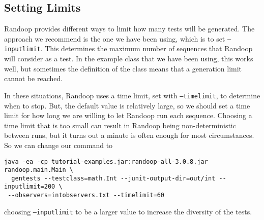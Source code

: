 \documentclass[11pt, oneside]{article} %
\newcommand{\cmd}[1]{{\texttt{#1}}}
\begin{document}
\subsection{Setting Limits}
Randoop provides different ways to limit how many tests will be generated.
The approach we recommend is the one we have been using, which is to set \cmd{--inputlimit}.
This determines the maximum number of sequences that Randoop will consider as a test.
In the example class that we have been using, this works well, but sometimes the definition of the class means that a generation limit cannot be reached.

In these situations, Randoop uses a time limit, set with \cmd{--timelimit}, to determine when to stop.
But, the default value is relatively large, so we should set a time limit for how long we are willing to let Randoop run each sequence. 
Choosing a time limit that is too small can result in Randoop being non-deterministic between runs, but it turns out a minute is often enough for most circumstances.
So we can change our command to 
\begin{verbatim}
java -ea -cp tutorial-examples.jar:randoop-all-3.0.8.jar randoop.main.Main \
  gentests --testclass=math.Int --junit-output-dir=out/int --inputlimit=200 \
 --observers=intobservers.txt --timelimit=60
\end{verbatim}
choosing \cmd{--inputlimit} to be a larger value to increase the diversity of the tests.
\end{document}
